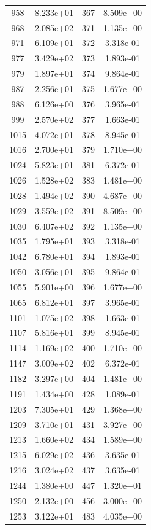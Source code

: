 \documentclass[12pt]{article}
\begin{document}
\begin{longtable}{@{}cccc@{}}
958 & 8.233e+01 & 367 & 8.509e+00 \\
968 & 2.085e+02 & 371 & 1.135e+00 \\
971 & 6.109e+01 & 372 & 3.318e-01 \\
977 & 3.429e+02 & 373 & 1.893e-01 \\
979 & 1.897e+01 & 374 & 9.864e-01 \\
987 & 2.256e+01 & 375 & 1.677e+00 \\
988 & 6.126e+00 & 376 & 3.965e-01 \\
999 & 2.570e+02 & 377 & 1.663e-01 \\
1015 & 4.072e+01 & 378 & 8.945e-01 \\
1016 & 2.700e+01 & 379 & 1.710e+00 \\
1024 & 5.823e+01 & 381 & 6.372e-01 \\
1026 & 1.528e+02 & 383 & 1.481e+00 \\
1028 & 1.494e+02 & 390 & 4.687e+00 \\
1029 & 3.559e+02 & 391 & 8.509e+00 \\
1030 & 6.407e+02 & 392 & 1.135e+00 \\
1035 & 1.795e+01 & 393 & 3.318e-01 \\
1042 & 6.780e+01 & 394 & 1.893e-01 \\
1050 & 3.056e+01 & 395 & 9.864e-01 \\
1055 & 5.901e+00 & 396 & 1.677e+00 \\
1065 & 6.812e+01 & 397 & 3.965e-01 \\
1101 & 1.075e+02 & 398 & 1.663e-01 \\
1107 & 5.816e+01 & 399 & 8.945e-01 \\
1114 & 1.169e+02 & 400 & 1.710e+00 \\
1147 & 3.009e+02 & 402 & 6.372e-01 \\
1182 & 3.297e+00 & 404 & 1.481e+00 \\
1191 & 1.434e+00 & 428 & 1.089e-01 \\
1203 & 7.305e+01 & 429 & 1.368e+00 \\
1209 & 3.710e+01 & 431 & 3.927e+00 \\
1213 & 1.660e+02 & 434 & 1.589e+00 \\
1215 & 6.029e+02 & 436 & 3.635e-01 \\
1216 & 3.024e+02 & 437 & 3.635e-01 \\
1244 & 1.380e+00 & 447 & 1.320e+01 \\
1250 & 2.132e+00 & 456 & 3.000e+00 \\
1253 & 3.122e+01 & 483 & 4.035e+00 \\

\end{longtable}
\end{document}
